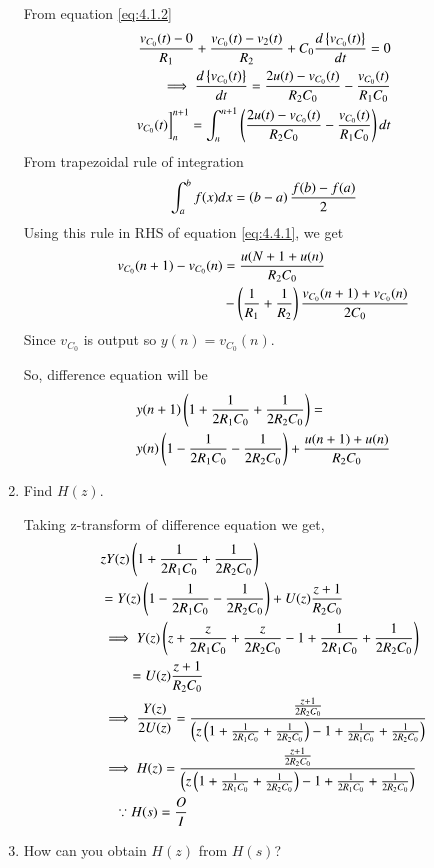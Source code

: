 \documentclass[journal,12pt,twocolumn]{IEEEtran}
\renewcommand\thesection{\arabic{section}}
\begin{document}
\begin{enumerate}[label=\arabic*.,ref=\thesection.\theenumi]
		\solution
		From equation \eqref{eq:4.1.2}
		\begin{align}
\frac{v_{C_0}(t)-0}{R_1}+\frac{v_{C_0}(t)-v_2(t)}{R_2}+C_0\frac{d\left\{v_{C_0}(t)\right\}}{dt}=0\\
\implies \frac{d\left\{v_{C_0}(t)\right\}}{dt}=\frac{2u(t)-v_{C_0}(t)}{R_2C_0}-\frac{v_{C_0}(t)}{R_1C_0}
\\
			v_{C_0}(t)\bigg]_n^{n+1}=\int_n^{n+1}\left(\frac{2u(t)-v_{C_0}(t)}{R_2C_0}-\frac{v_{C_0}(t)}{R_1C_0}\right)dt \label{eq:4.4.1}
		\end{align}
		From trapezoidal rule of integration
		\begin{align}
			\int_a^b f(x)dx=\left(b-a\right)\frac{f(b)-f(a)}{2}
			\label{eq:trap_rule}
		\end{align}
	Using this rule in RHS of equation \eqref{eq:4.4.1}, we get
	\begin{align}
		v_{C_0}(n+1)-v_{C_0}(n)&=\frac{u(N+1+u(n)}{R_2C_0}\\
		&-\left(\frac{1}{R_1}+\frac{1}{R_2}\right)\frac{v_{C_0}(n+1)+v_{C_0}(n)}{2C_0}
	\end{align}
	Since $v_{C_0}$ is output so $y(n)=v_{C_0}(n)$.

	So, difference equation will be
	\begin{align}
		&y(n+1)\left(1+\frac{1}{2R_1C_0}+\frac{1}{2R_2C_0}\right)=\\
		&y(n)\left(1-\frac{1}{2R_1C_0}-\frac{1}{2R_2C_0}\right)+\frac{u(n+1)+u(n)}{R_2C_0}
\end{align}
	\item Find $H(z)$.

		\solution
		Taking z-transform of difference equation we get,
		\begin{align}
			&zY(z)\left(1+\frac{1}{2R_1C_0}+\frac{1}{2R_2C_0}\right)\\
			&=Y(z)\left(1-\frac{1}{2R_1C_0}-\frac{1}{2R_2C_0}\right)+U(z)\frac{z+1}{R_2C_0}\\
			&\implies Y(z)\left(z+\frac{z}{2R_1C_0}+\frac{z}{2R_2C_0}-1+\frac{1}{2R_1C_0}+\frac{1}{2R_2C_0}\right)\\
			&\quad \quad	=U(z)\frac{z+1}{R_2C_0}\\
			&\implies \frac{Y(z)}{2U(z)}=\frac{\frac{z+1}{2R_2C_0}}{\left(z\left(1+\frac{1}{2R_1C_0}+\frac{1}{2R_2C_0}\right)-1+\frac{1}{2R_1C_0}+\frac{1}{2R_2C_0}\right)}\\
			&\implies H(z)=\frac{\frac{z+1}{2R_2C_0}}{\left(z\left(1+\frac{1}{2R_1C_0}+\frac{1}{2R_2C_0}\right)-1+\frac{1}{2R_1C_0}+\frac{1}{2R_2C_0}\right)}\\
			&\quad \because H(s)=\frac{O}{I}
		\end{align}
	\item How can you obtain $H(z)$ from $H(s)$?
		

\end{enumerate}
\end{document}
